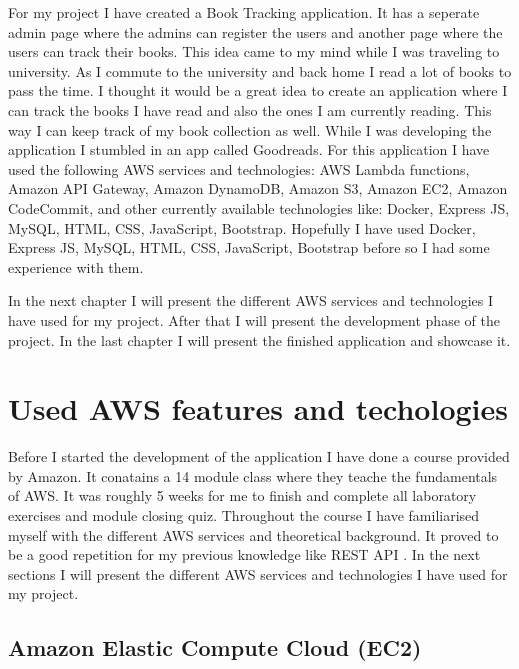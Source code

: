 \documentclass[11pt,a4paper,oneside]{report}
\begin{document}
For my project I have created a Book Tracking application.
It has a seperate admin page where the admins can register the users and another page where the users can track their books.
This idea came to my mind while I was traveling to university. As I commute to the university and back home I read a lot of books to pass the time.
I thought it would be a great idea to create an application where I can track the books I have read and also the ones I am currently reading.
This way I can keep track of my book collection as well. While I was developing the application I stumbled in an app called Goodreads.
For this application I have used the following AWS services and technologies: AWS Lambda functions, Amazon API Gateway, Amazon DynamoDB, Amazon S3, Amazon EC2, Amazon CodeCommit, and other currently available technologies like:  Docker, Express JS, MySQL, HTML, CSS, JavaScript, Bootstrap.
Hopefully I have used Docker, Express JS, MySQL, HTML, CSS, JavaScript, Bootstrap before so I had some experience with them.

In the next chapter I will present the different AWS services and technologies I have used for my project. After that I will present the development phase of the project. In the last chapter I will present the finished application and showcase it.
\chapter{Used AWS features and techologies}

Before I started the development of the application I have done a course provided by Amazon. It conatains a 14 module class where they teache the fundamentals of AWS.
It was roughly 5 weeks for me to finish and complete all laboratory exercises and module closing quiz. Throughout the course I have familiarised myself with the different AWS services and theoretical background. It proved to be a good repetition for my previous knowledge like REST API  \cite{awsacademy}.
In the next sections I will present the different AWS services and technologies I have used for my project.

\section{Amazon Elastic Compute Cloud (EC2)}
\end{document}
